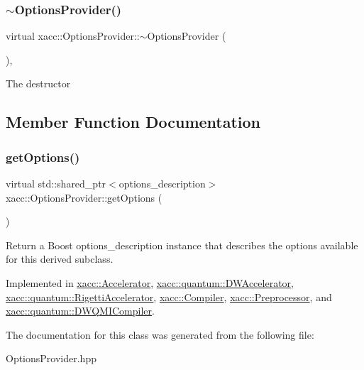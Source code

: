 \subsubsection{\texorpdfstring{$\sim$\+Options\+Provider()}{~OptionsProvider()}}
{\footnotesize\ttfamily virtual xacc\+::\+Options\+Provider\+::$\sim$\+Options\+Provider (\begin{DoxyParamCaption}{ }\end{DoxyParamCaption})\hspace{0.3cm}{\ttfamily [inline]}, {\ttfamily [virtual]}}

The destructor 

\subsection{Member Function Documentation}
\mbox{\label{a01721_a6d150954f852109bfe2c1ae90222926f}} 
\subsubsection{\texorpdfstring{get\+Options()}{getOptions()}}
{\footnotesize\ttfamily virtual std\+::shared\+\_\+ptr$<$options\+\_\+description$>$ xacc\+::\+Options\+Provider\+::get\+Options (\begin{DoxyParamCaption}{ }\end{DoxyParamCaption})\hspace{0.3cm}{\ttfamily [pure virtual]}}

Return a Boost options\+\_\+description instance that describes the options available for this derived subclass. 

Implemented in \hyperlink{a01613_a98c9eda6b54367c75667ecfbbf167979}{xacc\+::\+Accelerator}, \hyperlink{a01133_a09926db9f99706307ae6ce5b56845bca}{xacc\+::quantum\+::\+D\+W\+Accelerator}, \hyperlink{a01165_a9ee9e62aecbccf193894ca3388676f9f}{xacc\+::quantum\+::\+Rigetti\+Accelerator}, \hyperlink{a01629_a9f5a8965c9c2dd895016d18264ebbe92}{xacc\+::\+Compiler}, \hyperlink{a01637_a96f5600ea47628b66917c7b90250e7f1}{xacc\+::\+Preprocessor}, and \hyperlink{a01137_a0851334cc33b5b1da2694150a0a1a43c}{xacc\+::quantum\+::\+D\+W\+Q\+M\+I\+Compiler}.



The documentation for this class was generated from the following file\+:\begin{DoxyCompactItemize}
\item 
Options\+Provider.\+hpp\end{DoxyCompactItemize}
